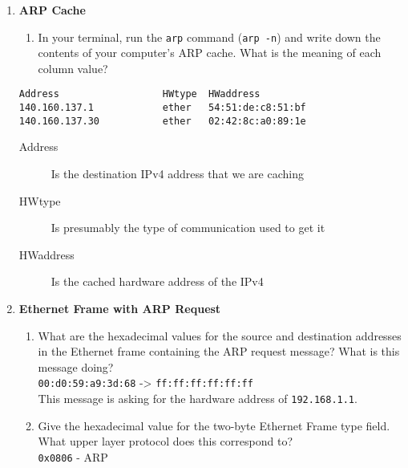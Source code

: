 \documentclass[12pt]{article}
\begin{document}
\begin{enumerate}[label=Q\arabic*:]
      \item \textbf{ARP Cache}
            \begin{enumerate}[label=(\alph*)]
                  \item In your terminal, run the \texttt{arp} command (\texttt{arp -n}) and write down the contents of your computer's ARP cache. What is the meaning of each column value?
            \end{enumerate}
            \begin{verbatim}
Address                  HWtype  HWaddress        
140.160.137.1            ether   54:51:de:c8:51:bf
140.160.137.30           ether   02:42:8c:a0:89:1e
          \end{verbatim}

            \begin{description}
                  \item[Address] Is the destination IPv4 address that we are caching
                  \item[HWtype] Is presumably the type of communication used to get it
                  \item[HWaddress] Is the cached hardware address of the IPv4
            \end{description}

            \clearpage

      \item \textbf{Ethernet Frame with ARP Request}
            \begin{enumerate}[label=(\alph*)]
                  \item What are the hexadecimal values for the source and destination addresses in the Ethernet frame containing the ARP request message? What is this message doing? \\
                        \texttt{00:d0:59:a9:3d:68} -> \texttt{ff:ff:ff:ff:ff:ff} \\
                        This message is asking for the hardware address of \texttt{192.168.1.1}.
                  \item Give the hexadecimal value for the two-byte Ethernet Frame type field. What upper layer protocol does this correspond to? \\
                        \texttt{0x0806} - ARP
            \end{enumerate}


\end{enumerate}
\end{document}
